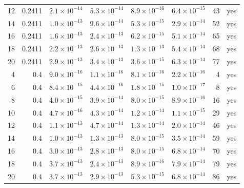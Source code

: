 \documentclass[11pt]{article}
\begin{document}
{\begin{longtable}{rrrrrrrr}
12 & 0.2411 & $2.1\times10^{-14}$ & $5.3\times10^{-14}$ & $8.9\times10^{-16}$ & $6.4\times10^{-15}$ & 43 & yes \\
14 & 0.2411 & $1.0\times10^{-13}$ & $9.6\times10^{-14}$ & $5.3\times10^{-15}$ & $2.9\times10^{-14}$ & 52 & yes \\
16 & 0.2411 & $1.6\times10^{-13}$ & $2.4\times10^{-13}$ & $6.2\times10^{-15}$ & $5.1\times10^{-14}$ & 65 & yes \\
18 & 0.2411 & $2.2\times10^{-13}$ & $2.6\times10^{-13}$ & $1.3\times10^{-13}$ & $5.4\times10^{-14}$ & 68 & yes \\
20 & 0.2411 & $2.9\times10^{-13}$ & $3.4\times10^{-13}$ & $3.6\times10^{-15}$ & $6.3\times10^{-14}$ & 77 & yes \\
4 & 0.4 & $9.0\times10^{-16}$ & $1.1\times10^{-16}$ & $8.1\times10^{-16}$ & $2.2\times10^{-16}$ & 4 & yes \\
6 & 0.4 & $8.4\times10^{-15}$ & $4.4\times10^{-16}$ & $1.8\times10^{-15}$ & $1.0\times10^{-17}$ & 8 & yes \\
8 & 0.4 & $4.0\times10^{-15}$ & $3.9\times10^{-14}$ & $8.0\times10^{-15}$ & $8.9\times10^{-16}$ & 16 & yes \\
10 & 0.4 & $4.7\times10^{-16}$ & $4.3\times10^{-14}$ & $1.2\times10^{-14}$ & $1.1\times10^{-15}$ & 29 & yes \\
12 & 0.4 & $1.1\times10^{-13}$ & $4.7\times10^{-14}$ & $1.3\times10^{-14}$ & $2.0\times10^{-14}$ & 46 & yes \\
14 & 0.4 & $1.0\times10^{-13}$ & $1.3\times10^{-13}$ & $8.0\times10^{-15}$ & $3.5\times10^{-14}$ & 59 & yes \\
16 & 0.4 & $3.0\times10^{-13}$ & $2.8\times10^{-13}$ & $8.0\times10^{-15}$ & $6.8\times10^{-14}$ & 70 & yes \\
18 & 0.4 & $3.7\times10^{-13}$ & $2.4\times10^{-13}$ & $8.9\times10^{-16}$ & $7.9\times10^{-14}$ & 79 & yes \\
20 & 0.4 & $3.7\times10^{-13}$ & $2.9\times10^{-13}$ & $5.3\times10^{-15}$ & $6.8\times10^{-14}$ & 86 & yes \\
\end{longtable}
}
\end{document}
